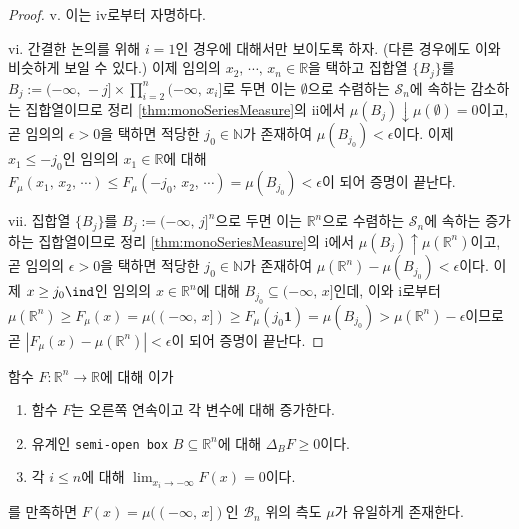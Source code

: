 \begin{proof}
    v. 이는 iv로부터 자명하다.

    vi. 간결한 논의를 위해 $i=1$인 경우에 대해서만 보이도록 하자. (다른 경우에도 이와 비슷하게 보일 수 있다.) 이제 임의의 $x_2,\,\cdots,\,x_n\in\mathbb{R}$을 택하고 집합열 $\{B_j\}$를 $B_j:=(-\infty,\,-j]\times\prod_{i=2}^n(-\infty,\,x_i]$로 두면 이는 $\emptyset$으로 수렴하는 $\mathcal{S}_n$에 속하는 감소하는 집합열이므로 정리 \ref{thm:monoSeriesMeasure}의 ii에서 $\mu(B_j)\downarrow\mu(\emptyset)=0$이고, 곧 임의의 $\epsilon>0$을 택하면 적당한 $j_0\in\mathbb{N}$가 존재하여 $\mu(B_{j_0})<\epsilon$이다. 이제 $x_1\leq-j_0$인 임의의 $x_1\in\mathbb{R}$에 대해 $F_\mu(x_1,\,x_2,\,\cdots)\leq F_\mu(-j_0,\,x_2,\,\cdots)=\mu(B_{j_0})<\epsilon$이 되어 증명이 끝난다.

    vii. 집합열 $\{B_j\}$를 $B_j:=(-\infty,\,j]^n$으로 두면 이는 $\mathbb{R}^n$으로 수렴하는 $\mathcal{S}_n$에 속하는 증가하는 집합열이므로 정리 \ref{thm:monoSeriesMeasure}의 i에서 $\mu(B_j)\uparrow\mu(\mathbb{R}^n)$이고, 곧 임의의 $\epsilon>0$을 택하면 적당한 $j_0\in\mathbb{N}$가 존재하여 $\mu(\mathbb{R}^n)-\mu(B_{j_0})<\epsilon$이다. 이제 $x\geq j_0\ind$인 임의의 $x\in\mathbb{R}^n$에 대해 $B_{j_0}\subseteq(-\infty,\,x]$인데, 이와 i로부터 $\mu(\mathbb{R}^n)\geq F_\mu(x)=\mu((-\infty,\,x])\geq F_\mu(j_0\mathbf{1})=\mu(B_{j_0})>\mu(\mathbb{R}^n)-\epsilon$이므로 곧 $|F_\mu(x)-\mu(\mathbb{R}^n)|<\epsilon$이 되어 증명이 끝난다.
\end{proof}

\begin{theorem}\label{thm:finiteBorelSpecify}
    함수 $F:\mathbb{R}^n\to\mathbb{R}$에 대해 이가
    \begin{enumerate}
        \item 함수 $F$는 오른쪽 연속이고 각 변수에 대해 증가한다.
        \item 유계인  \texttt{semi-open box} $B\subseteq\mathbb{R}^n$에 대해 $\Delta_BF\geq0$이다.
        \item 각 $i\leq n$에 대해 $\lim_{x_i\to-\infty}F(x)=0$이다.
    \end{enumerate}
    를 만족하면 $F(x)=\mu((-\infty,\,x])$인 $\mathcal{B}_n$ 위의 측도 $\mu$가 유일하게 존재한다.
\end{theorem}

